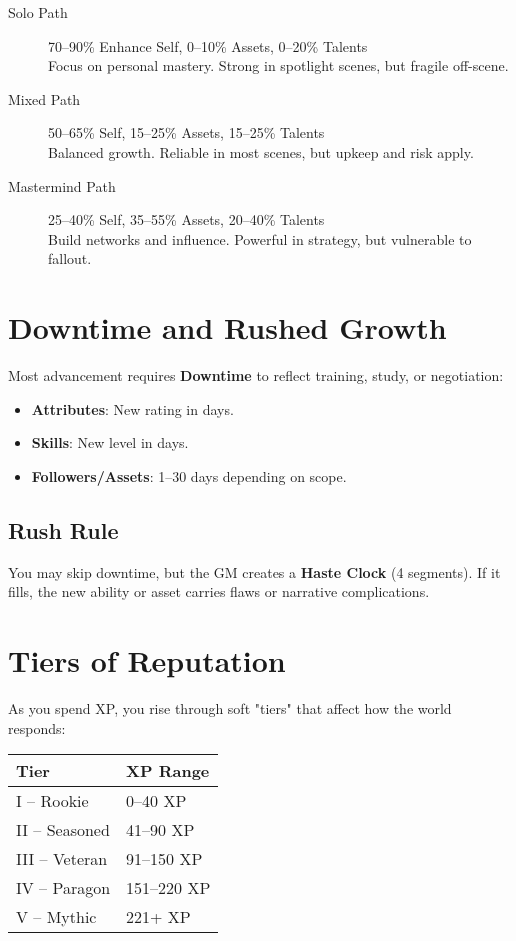\begin{description}
  \item[Solo Path] 70–90\% Enhance Self, 0–10\% Assets, 0–20\% Talents \\
    Focus on personal mastery. Strong in spotlight scenes, but fragile off-scene.

  \item[Mixed Path] 50–65\% Self, 15–25\% Assets, 15–25\% Talents \\
    Balanced growth. Reliable in most scenes, but upkeep and risk apply.

  \item[Mastermind Path] 25–40\% Self, 35–55\% Assets, 20–40\% Talents \\
    Build networks and influence. Powerful in strategy, but vulnerable to fallout.
\end{description}

\section{Downtime and Rushed Growth}

Most advancement requires \textbf{Downtime} to reflect training, study, or negotiation:

\begin{itemize}
  \item \textbf{Attributes}: New rating in days.
  \item \textbf{Skills}: New level in days.
  \item \textbf{Followers/Assets}: 1–30 days depending on scope.
\end{itemize}

\subsection*{Rush Rule}

You may skip downtime, but the GM creates a \textbf{Haste Clock} (4 segments). If it fills, the new ability or asset carries flaws or narrative complications.

\section{Tiers of Reputation}

As you spend XP, you rise through soft "tiers" that affect how the world responds:

\begin{center}
\begin{tabular}{ll}
\toprule
\textbf{Tier} & \textbf{XP Range} \\
\midrule
I – Rookie & 0–40 XP \\
II – Seasoned & 41–90 XP \\
III – Veteran & 91–150 XP \\
IV – Paragon & 151–220 XP \\
V – Mythic & 221+ XP \\
\bottomrule
\end{tabular}
\end{center}

